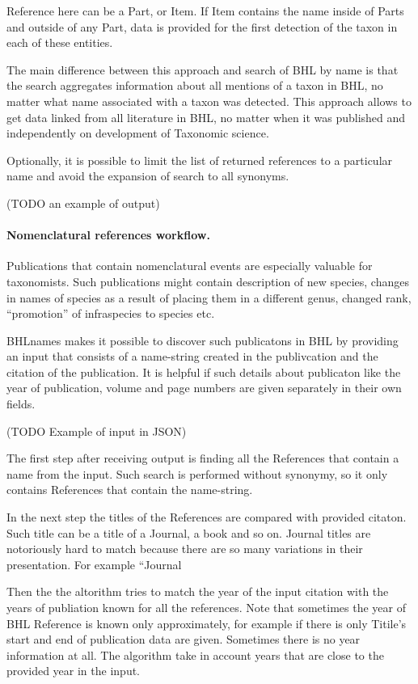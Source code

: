 \documentclass[
]{article}
\begin{document}
Reference here can be a Part, or Item. If Item contains the name inside
of Parts and outside of any Part, data is provided for the first
detection of the taxon in each of these entities.

The main difference between this approach and search of BHL by name is
that the search aggregates information about all mentions of a taxon in
BHL, no matter what name associated with a taxon was detected. This
approach allows to get data linked from all literature in BHL, no matter
when it was published and independently on development of Taxonomic
science.

Optionally, it is possible to limit the list of returned references to a
particular name and avoid the expansion of search to all synonyms.

(TODO an example of output)

\hypertarget{nomenclatural-references-workflow.}{%
\paragraph{Nomenclatural references
workflow.}\label{nomenclatural-references-workflow.}}

Publications that contain nomenclatural events are especially valuable
for taxonomists. Such publications might contain description of new
species, changes in names of species as a result of placing them in a
different genus, changed rank, ``promotion'' of infraspecies to species
etc.

BHLnames makes it possible to discover such publicatons in BHL by
providing an input that consists of a name-string created in the
publivcation and the citation of the publication. It is helpful if such
details about publicaton like the year of publication, volume and page
numbers are given separately in their own fields.

(TODO Example of input in JSON)

The first step after receiving output is finding all the References that
contain a name from the input. Such search is performed without
synonymy, so it only contains References that contain the name-string.

In the next step the titles of the References are compared with provided
citaton. Such title can be a title of a Journal, a book and so on.
Journal titles are notoriously hard to match because there are so many
variations in their presentation. For example ``Journal

Then the the altorithm tries to match the year of the input citation
with the years of publiation known for all the references. Note that
sometimes the year of BHL Reference is known only approximately, for
example if there is only Titile's start and end of publication data are
given. Sometimes there is no year information at all. The algorithm take
in account years that are close to the provided year in the input.
\end{document}
